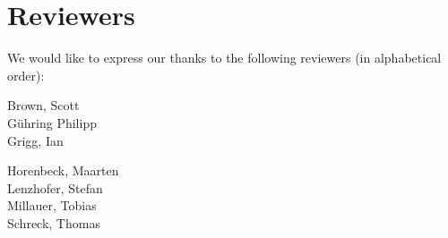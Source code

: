 \section{Reviewers}

We would like to express our thanks to the following reviewers (in alphabetical order):


\vline{}

\begin{minipage}[b]{0.5\linewidth}
\center
Brown, Scott \\
G\"uhring Philipp  \\
Grigg, Ian  \\
\end{minipage}
\begin{minipage}[b]{0.5\linewidth}
\center
Horenbeck, Maarten \\
Lenzhofer, Stefan \\
Millauer, Tobias \\
Schreck, Thomas  \\
\end{minipage}


